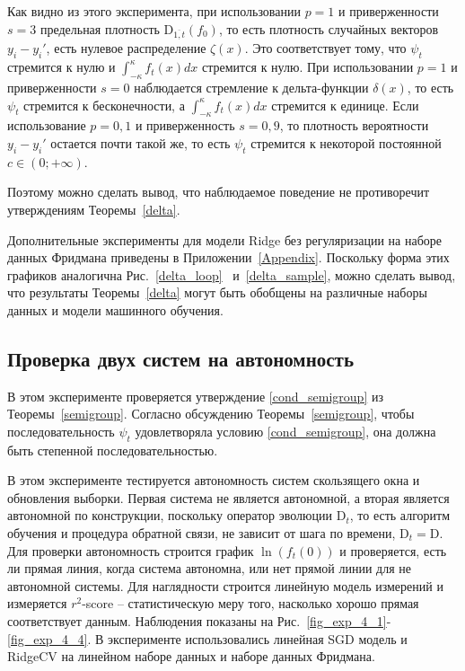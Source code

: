     Как видно из этого эксперимента, при использовании $p = 1$ и приверженности $s = 3$ предельная плотность $\text{D}_{\overline{1, t}}(f_0)$, то есть плотность случайных векторов $y_i - y_i'$, есть нулевое распределение $\zeta(x)$. Это соответствует тому, что $\psi_t$ стремится к нулю и $\int_{-\kappa}^{\kappa}f_t(x)dx$ стремится к нулю.
    При использовании $p = 1$ и приверженности $s = 0$ наблюдается стремление к дельта-функции $\delta(x)$, то есть $\psi_t$ стремится к бесконечности, а $\int_{-\kappa}^{\kappa}f_t(x)dx$ стремится к единице. 
    Если использование $p = 0,1$ и приверженность $s = 0,9$, то плотность вероятности $y_i - y_i'$ остается почти такой же, то есть $\psi_t$ стремится к некоторой постоянной $c \in (0; +\infty)$. 

    Поэтому можно сделать вывод, что наблюдаемое поведение не противоречит утверждениям Теоремы~\ref{delta}.

    Дополнительные эксперименты для модели Ridge без регуляризации на наборе данных Фридмана приведены в Приложении~\ref{Appendix}. Поскольку форма этих графиков аналогична Рис.~\ref{delta_loop}~ и~\ref{delta_sample}, можно сделать вывод, что результаты Теоремы~\ref{delta} могут быть обобщены на различные наборы данных и модели машинного обучения.

\subsection{Проверка двух систем на автономность} \label{exp_4}

    В этом эксперименте проверяется утверждение \eqref{cond_semigroup} из Теоремы~\ref{semigroup}. Согласно обсуждению Теоремы~\ref{semigroup}, чтобы последовательность $\psi_t$ удовлетворяла условию \eqref{cond_semigroup}, она должна быть степенной последовательностью.

    В этом эксперименте тестируется автономность систем скользящего окна и обновления выборки. Первая система не является автономной, а вторая является автономной по конструкции, поскольку оператор эволюции $\text{D}_t$, то есть алгоритм обучения и процедура обратной связи, не зависит от шага по времени, $\text{D}_t = \text{D}$.
    Для проверки автономность строится график $\ln(f_t(0))$ и проверяется, есть ли прямая линия, когда система автономна, или нет прямой линии для не автономной системы. Для наглядности строится линейную модель измерений и измеряется $r^2$-score -- статистическую меру того, насколько хорошо прямая соответствует данным. Наблюдения показаны на Рис.~\ref{fig_exp_4_1}-\ref{fig_exp_4_4}. В эксперименте использовались линейная SGD модель и RidgeCV на линейном наборе данных и наборе данных Фридмана.

